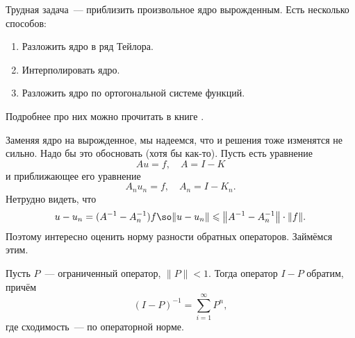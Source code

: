 \documentclass{trlnotes}
\begin{document}
    Трудная задача~--- приблизить произвольное ядро вырожденным. Есть несколько способов:

    \begin{enumerate}
        \item Разложить ядро в ряд Тейлора.
        \item Интерполировать ядро.
        \item Разложить ядро по ортогональной системе функций.
    \end{enumerate}


    Подробнее про них можно прочитать в книге \cite{comp-krilov-2}.

    Заменяя ядро на вырожденное, мы надеемся, что и решения тоже изменятся не сильно. Надо бы это обосновать (хотя бы как-то). Пусть есть уравнение
    \[
        Au = f, \quad A = I - K
    \]
    и приближающее его уравнение
    \[
        A_n u_n = f, \quad A_n = I - K_n. 
    \]
    Нетрудно видеть, что
    \[
        u - u_n = (A^{-1} - A_n^{-1})f \so \|u - u_n\| \leqslant \big\|A^{-1} - A_n^{-1}\big\| \cdot \|f\|.
    \]
    Поэтому интересно оценить норму разности обратных операторов. Займёмся этим.

    \begin{st}\label{st:close-zero-inv}
        Пусть $P$~--- ограниченный оператор, $\|P\| < 1$. Тогда оператор $I - P$ обратим, причём
        \[
            (I - P)^{-1} = \sum\limits_{i = 1}^{\infty} P^n,
        \]
        где сходимость~--- по операторной норме.
    \end{st}
\end{document}

